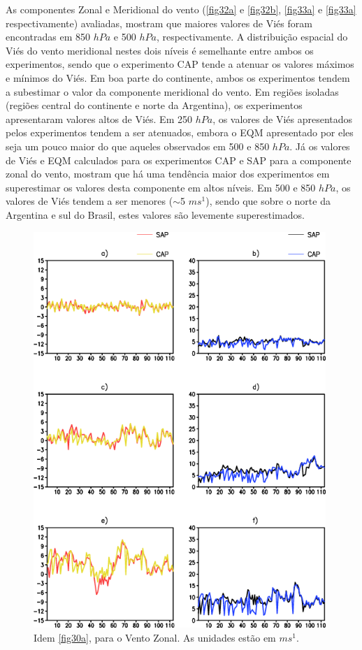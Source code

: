 As componentes Zonal e Meridional do vento (\autoref{fig32a} e \autoref{fig32b}, \autoref{fig33a} e \autoref{fig33a} respectivamente) avaliadas, mostram que maiores valores de Viés foram encontradas em 850 $hPa$ e 500 $hPa$, respectivamente. A distribuição espacial do Viés do vento meridional nestes dois níveis é semelhante entre ambos os experimentos, sendo que o experimento CAP tende a atenuar os valores máximos e mínimos do Viés. Em boa parte do continente, ambos os experimentos tendem a subestimar o valor da componente meridional do vento. Em regiões isoladas (regiões central do continente e norte da Argentina), os experimentos apresentaram valores altos de Viés. Em 250 $hPa$, os valores de Viés apresentados pelos experimentos tendem a ser atenuados, embora o EQM apresentado por eles seja um pouco maior do que aqueles observados em 500 e 850 $hPa$. Já os valores de Viés e EQM calculados para os experimentos CAP e SAP para a componente zonal do vento, mostram que há uma tendência maior dos experimentos em superestimar os valores desta componente em altos níveis. Em 500 e 850 $hPa$, os valores de Viés tendem a ser menores ($\sim$5 $ms^{1}$), sendo que sobre o norte da Argentina e sul do Brasil, estes valores são levemente superestimados.

\begin{figure}[!hbp]
\centering
\includegraphics[height=15cm]{./figs/vies_eqm-uvel.png}
\caption{Idem \autoref{fig30a}, para o Vento Zonal. As unidades estão em $ms^{1}$.}
\label{fig32a}
\end{figure}

